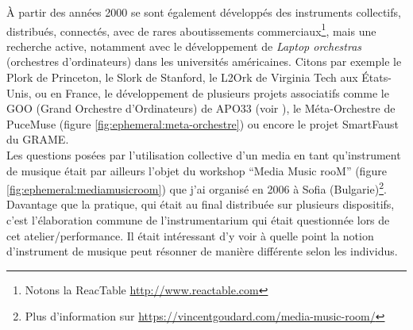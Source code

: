 \noindent À partir des années 2000 se sont également développés des instruments collectifs, distribués, connectés, avec de rares aboutissements commerciaux\footnote{Notons la ReacTable \url{http://www.reactable.com}}, mais une recherche active, notamment avec le développement de \textit{Laptop orchestras} (orchestres d'ordinateurs) dans les universités américaines. Citons par exemple le Plork de Princeton, le Slork de Stanford, le L2Ork de Virginia Tech aux États-Unis, ou en France, le développement de plusieurs projets associatifs comme le GOO (Grand Orchestre d'Ordinateurs) de \gls{APO33} (voir \cite{apo33_lorchestre_2003}), le Méta-Orchestre de PuceMuse (figure \ref{fig:ephemeral:meta-orchestre}) ou encore le projet SmartFaust du \gls{GRAME}.\\
\indent Les questions posées par l'utilisation collective d'un media en tant qu'instrument de musique était par ailleurs l'objet du workshop ``Media Music rooM'' (figure \ref{fig:ephemeral:mediamusicroom}) que j'ai organisé en 2006 à Sofia (Bulgarie)\footnote{Plus d'information sur \url{https://vincentgoudard.com/media-music-room/}}. Davantage que la pratique, qui était au final distribuée sur plusieurs dispositifs, c'est l'élaboration commune de l'instrumentarium qui était questionnée lors de cet atelier/performance. Il était intéressant d'y voir à quelle point la notion d'instrument de musique peut résonner de manière différente selon les individus.\\
